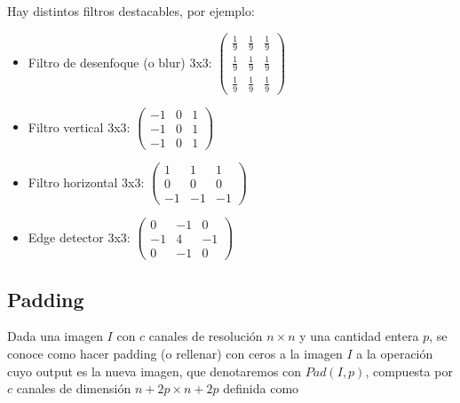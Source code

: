 \documentclass{article}
\begin{document}
Hay distintos filtros destacables, por ejemplo:
\begin{itemize}
\item Filtro de desenfoque (o blur) 3x3: $\begin{pmatrix}
\frac{1}{9} & \frac{1}{9} & \frac{1}{9}\\
\frac{1}{9} & \frac{1}{9} & \frac{1}{9}\\
\frac{1}{9} & \frac{1}{9} & \frac{1}{9}
\end{pmatrix}$

\item Filtro vertical 3x3: $\begin{pmatrix}
-1 & 0 & 1\\
-1 & 0 & 1\\
-1 & 0 & 1
\end{pmatrix}$

\item Filtro horizontal 3x3: $\begin{pmatrix}
1 & 1 & 1\\
0 & 0 & 0\\
-1 & -1 & -1
\end{pmatrix}$

\item Edge detector 3x3: $\begin{pmatrix}
0 & -1 & 0\\
-1 & 4 & -1\\
0 & -1 & 0
\end{pmatrix}$


\end{itemize}



\subsection{Padding}
Dada una imagen $I$ con $c$ canales de resolución $n\times n$ y una cantidad entera $p$, se conoce como hacer padding (o rellenar) con ceros a la imagen $I$ a la operación cuyo output es la nueva imagen, que denotaremos con $Pad(I,p)$, compuesta por $c$ canales de dimensión $n+2p\times n+2p$ definida como
\end{document}
